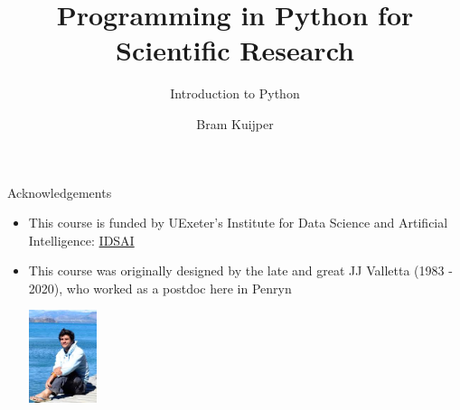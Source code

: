 \documentclass[xcolor=table,aspectratio=169]{beamer}
\begin{document}
\title{Programming in Python for Scientific Research}   
\subtitle{Introduction to Python}   
\author{Bram Kuijper}
\date{}

\frame{\titlepage} 
\begin{frame}{Acknowledgements}
\begin{itemize}\addtolength{\itemsep}{\baselineskip}
    \item This course is funded by UExeter's Institute for Data Science and Artificial Intelligence: \href{https://www.exeter.ac.uk/idsai/}{IDSAI}
    \item This course was originally designed by the late and great JJ Valletta (1983 - 2020), who worked as a postdoc here in Penryn
\begin{center}
    \includegraphics[width = 20mm]{jj_valletta.jpg}
\end{center}
\end{itemize}

\end{frame}

\end{document}
